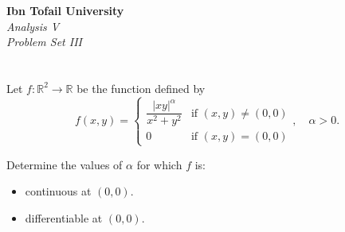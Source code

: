 \documentclass[12pt]{article}
\begin{document}
\begin{center}
\Large\textbf{Ibn Tofail University} \\[1em]
\large\textit{Analysis V} \\[2em]
\large\textit{Problem Set III} \\[0.5em]
\end{center}

\vspace{1cm}
\section{}
Let $f : \mathbb{R}^2 \to \mathbb{R}$ be the function defined by
$$f(x, y) = \begin{cases}
\dfrac{|xy|^\alpha}{x^2 + y^2} & \text{if } (x, y) \neq (0, 0) \\[0.5em]
0 & \text{if } (x, y) = (0, 0)
\end{cases}, \quad \alpha > 0.$$

Determine the values of $\alpha$ for which $f$ is:
\begin{itemize}
    \item continuous at $(0, 0)$.
    \item differentiable at $(0, 0)$.
\end{itemize}
\end{document}
